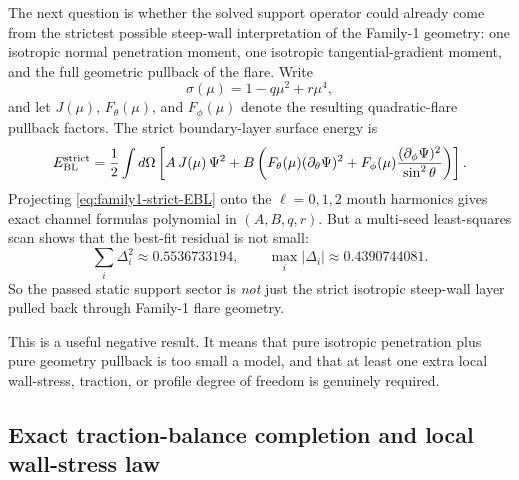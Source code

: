 \documentclass[11pt]{article}
\begin{document}
The next question is whether the solved support operator could already come from the
strictest possible steep-wall interpretation of the Family-1 geometry: one isotropic
normal penetration moment, one isotropic tangential-gradient moment, and the full
geometric pullback of the flare.  Write
\begin{equation}
\sigma(\mu)=1-q\mu^2+r\mu^4,
\label{eq:family1-sigma}
\end{equation}
and let \(J(\mu)\), \(F_\theta(\mu)\), and \(F_\phi(\mu)\) denote the resulting
quadratic-flare pullback factors.  The strict boundary-layer surface energy is
\begin{equation}
E^{\rm strict}_{\rm BL}
=
\frac12\int d\Omega
\left[
A\,J(\mu)\,\Psi^2
+
B\left(
F_{\theta}(\mu)(\partial_{\theta}\Psi)^2
+
F_{\phi}(\mu)\frac{(\partial_{\phi}\Psi)^2}{\sin^2\theta}
\right)
\right].
\label{eq:family1-strict-EBL}
\end{equation}
Projecting \cref{eq:family1-strict-EBL} onto the \(\ell=0,1,2\) mouth harmonics gives
exact channel formulas polynomial in \((A,B,q,r)\).  But a multi-seed least-squares scan
shows that the best-fit residual is not small:
\begin{equation}
\sum_i \Delta_i^2 \approx 0.5536733194,
\qquad
\max_i|\Delta_i|\approx 0.4390744081.
\label{eq:family1-strict-no-go-residual}
\end{equation}
So the passed static support sector is \emph{not} just the strict isotropic steep-wall
layer pulled back through Family-1 flare geometry.

This is a useful negative result.  It means that pure isotropic penetration plus pure
geometry pullback is too small a model, and that at least one extra local wall-stress,
traction, or profile degree of freedom is genuinely required.

\subsection{Exact traction-balance completion and local wall-stress law}
\label{app:family1-traction}
\end{document}
